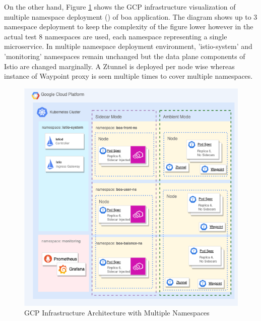 On the other hand, Figure \ref{method:multiNsInfraArch} shows the GCP infrastructure visualization of multiple namespace deployment (\cite{multiNsArticle}) of \acrshort{boa} application. The diagram shows up to 3 namespace deployment to keep the complexity of the figure lower however in the actual test 8 namespaces are used, each namespace representing a single microservice. In multiple namespace deployment environment, 'istio-system' and 'monitoring' namespaces remain unchanged but the data plane components of Istio are changed marginally. A Ztunnel is deployed per node wise whereas instance of Waypoint proxy is seen multiple times to cover multiple namespaces.
\begin{figure}[ht!]
    \centering
    \includegraphics[width=1.0\linewidth]{resources/multi-ns-test-infra.drawio.png}
    \caption{GCP Infrastructure Architecture with Multiple Namespaces}
    \label{method:multiNsInfraArch}
\end{figure}


